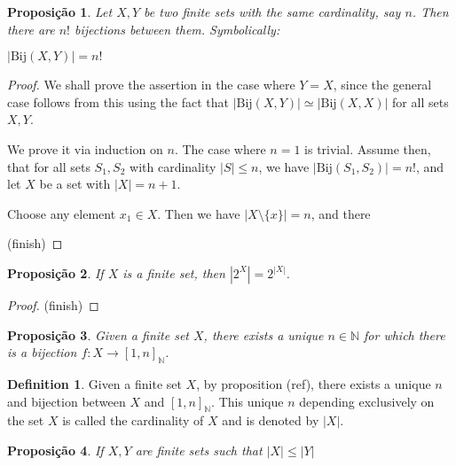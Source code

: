 \documentclass[]{article}
\newtheorem{proposition}{Proposição}[section]
\theoremstyle{definition}
\newtheorem{definition}{Definition}[section]
\theoremstyle{definition}
\newcommand{\raw}{\rightarrow}
\newcommand{\bb}{\mathbb}
\begin{document}
\begin{proposition}
	Let $X, Y$ be two finite sets with the same cardinality, say $n$. Then there are $n!$ bijections between them. Symbolically:
	
	\begin{center}
		$|\text{Bij}(X, Y)| = n!$
	\end{center}
\end{proposition}

\begin{proof}
	We shall prove the assertion in the case where $Y=X$, since the general case follows from this using the fact that $|\text{Bij}(X, Y)| \simeq |\text{Bij}(X, X)|$ for all sets $X, Y$.
	
	We prove it via induction on $n$. The case where $n=1$ is trivial. Assume then, that for all sets $S_1, S_2$ with cardinality $|S| \leq n$, we have $|\text{Bij}(S_1, S_2)| = n!$, and let $X$ be a set with $|X|=n+1$.
	
	Choose any element $x_1 \in X$. Then we have $|X \setminus \{x \}|=n$, and there
	
	(finish)
\end{proof}





\begin{proposition}
	If $X$ is a finite set, then $|2^X| =2^{|X|}$.
\end{proposition}

\begin{proof}
	(finish)
\end{proof}

\begin{proposition}\label{uniquesetcardinality}
	Given a finite set $X$, there exists a unique $n \in \bb{N}$ for which there is a bijection $f:X \raw [1, n]_{\bb{N}}$.
\end{proposition}

\begin{definition}\label{cardinality}
	Given a finite set $X$, by proposition (ref), there exists a unique $n$ and bijection between $X$ and $[1, n]_{\bb{N}}$. This unique $n$ depending exclusively on the set $X$ is called the cardinality of $X$ and is denoted by $|X|$.
\end{definition}

\begin{proposition}
	If $X, Y$ are finite sets such that $|X| \leq |Y|$ 
\end{proposition}
\end{document}
